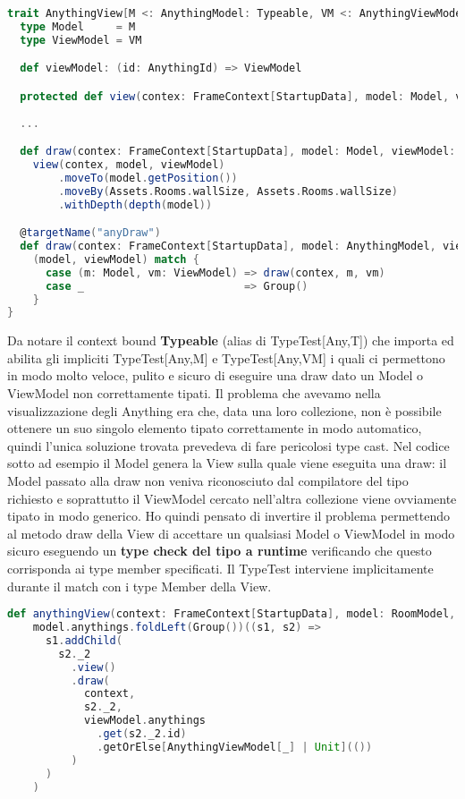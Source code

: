 \begin{lstlisting}[language=Scala]
trait AnythingView[M <: AnythingModel: Typeable, VM <: AnythingViewModel[M] | Unit: Typeable] {
  type Model     = M
  type ViewModel = VM

  def viewModel: (id: AnythingId) => ViewModel

  protected def view(contex: FrameContext[StartupData], model: Model, viewModel: ViewModel): View
  
  ...

  def draw(contex: FrameContext[StartupData], model: Model, viewModel: ViewModel): Group =
    view(contex, model, viewModel)
        .moveTo(model.getPosition())
        .moveBy(Assets.Rooms.wallSize, Assets.Rooms.wallSize)
        .withDepth(depth(model))

  @targetName("anyDraw")
  def draw(contex: FrameContext[StartupData], model: AnythingModel, viewModel: AnythingViewModel[_] | Unit): Group =
    (model, viewModel) match {
      case (m: Model, vm: ViewModel) => draw(contex, m, vm)
      case _                         => Group()
    }
}
\end{lstlisting}

Da notare il context bound \textbf{Typeable} (alias di TypeTest[Any,T]) che importa ed abilita gli impliciti TypeTest[Any,M] e TypeTest[Any,VM] i quali ci permettono in modo molto veloce, pulito e sicuro di eseguire una draw dato un Model o ViewModel non correttamente tipati.
Il problema che avevamo nella visualizzazione degli Anything era che, data una loro collezione, non è possibile ottenere un suo singolo elemento tipato correttamente in modo automatico, quindi l'unica soluzione trovata prevedeva di fare pericolosi type cast.
Nel codice sotto ad esempio il Model genera la View sulla quale viene eseguita una draw: il Model passato alla draw non veniva riconosciuto dal compilatore del tipo richiesto e soprattutto il ViewModel cercato nell'altra collezione viene ovviamente tipato in modo generico. 
Ho quindi pensato di invertire il problema permettendo al metodo draw della View di accettare un qualsiasi Model o ViewModel in modo sicuro eseguendo un \textbf{type check del tipo a runtime} verificando che questo corrisponda ai type member specificati.
Il TypeTest interviene implicitamente durante il match con i type Member della View.

\begin{lstlisting}[language=Scala]
def anythingView(context: FrameContext[StartupData], model: RoomModel, viewModel: RoomViewModel): Group =
    model.anythings.foldLeft(Group())((s1, s2) =>
      s1.addChild(
        s2._2
          .view()
          .draw(
            context,
            s2._2,
            viewModel.anythings
              .get(s2._2.id)
              .getOrElse[AnythingViewModel[_] | Unit](())
          )
      )
    )
\end{lstlisting}   

